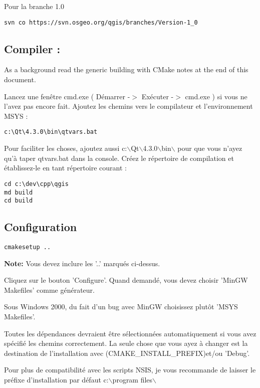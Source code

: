 Pour la branche 1.0

\begin{verbatim}
svn co https://svn.osgeo.org/qgis/branches/Version-1_0
\end{verbatim}

\subsection{Compiler :}
As a background read the generic building with CMake notes at the end of 
this document.

Lancez une fen\^etre cmd.exe ( D\'emarrer -$>$ Ex\'ecuter -$>$ cmd.exe ) si vous ne l'avez pas encore fait. Ajoutez les chemins vers le compilateur et l'environnement MSYS :

\begin{verbatim}
c:\Qt\4.3.0\bin\qtvars.bat 
\end{verbatim}

Pour faciliter les choses, ajoutez aussi c:$\backslash$Qt$\backslash$4.3.0$\backslash$bin$\backslash$ pour que vous n'ayez qu'\`a taper qtvars.bat dans la console. Cr\'eez le r\'epertoire de compilation et \'etablissez-le en tant r\'epertoire courant :

\begin{verbatim}
cd c:\dev\cpp\qgis 
md build 
cd build 
\end{verbatim}

\subsection{Configuration}
\begin{verbatim}
cmakesetup ..  
\end{verbatim}

\textbf{Note:} Vous devez inclure les '..' marqu\'es ci-dessus.

Cliquez sur le bouton 'Configure'.  Quand demand\'e, vous devez choisir 'MinGW Makefiles' comme g\'en\'erateur.

Sous Windows 2000, du fait d'un bug avec MinGW choisissez plut\^ot 'MSYS Makefiles'.

Toutes les d\'ependances devraient \^etre s\'electionn\'ees automatiquement si vous avez sp\'ecifi\'e les chemins correctement. La seule chose que vous ayez \`a changer est la destination de l'installation avec (CMAKE\_INSTALL\_PREFIX)et/ou 'Debug'.

Pour plus de compatibilit\'e avec les scripts NSIS, je vous recommande de laisser le pr\'efixe d'installation par d\'efaut  c:$\backslash$program files$\backslash$

